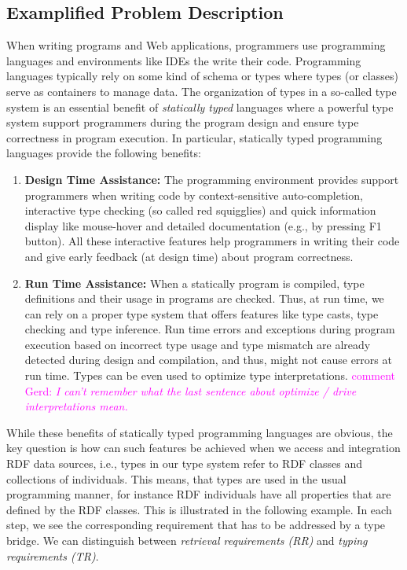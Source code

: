 \documentclass{llncs} %
\newcommand{\ggr}[1]{\textcolor{magenta}{comment Gerd: \textit{#1}}}
\begin{document}
\subsection{Examplified Problem Description}

When writing programs and Web applications, programmers use programming languages and environments like IDEs
the write their code. 
Programming languages typically rely on some kind of schema or types
where types (or classes) serve as containers to manage data.
The organization of types in a so-called type system is an essential benefit of \emph{statically typed} languages where a powerful type system support programmers during the program design and 
ensure type correctness in program execution. In particular, statically typed programming languages provide the following benefits:


\begin{enumerate}
	\item \textbf{Design Time Assistance:} The programming environment provides support programmers when writing code by
	 context-sensitive auto-completion, interactive type checking (so called red squigglies) and quick information display like mouse-hover
	and detailed documentation (e.g., by pressing F1 button). All these interactive features help programmers in writing their code
	and give early feedback (at design time) about program correctness. 
	\item \textbf{Run Time Assistance:} When a statically program is compiled, type definitions and their usage in programs
	        are checked. Thus, at run time, we can rely on a proper type system that offers features like type casts,
					 type checking and type inference. Run time errors and exceptions during program execution based on
					 incorrect type usage and type mismatch are already detected during design and compilation, and thus, might not
					cause errors at run time. Types can be even used to optimize type interpretations.
					\ggr{I can't remember what the last sentence about optimize / drive interpretations mean.}
					
\end{enumerate}

While these benefits of statically typed programming languages are obvious,
the key question is how can such features be achieved when we access and integration RDF data sources,
i.e., types in our type system refer to RDF classes and collections of individuals.
This means, that types are used in the usual programming manner, for instance RDF individuals
have all properties that are defined by the RDF classes. This is illustrated in the following example.
In each step, we see the corresponding requirement that has to be addressed by a type bridge.
We can distinguish between \emph{retrieval requirements (RR)} and \emph{typing requirements (TR)}.
\end{document}
